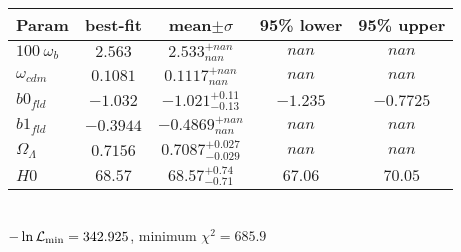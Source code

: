 \begin{tabular}{|l|c|c|c|c|} 
 \hline 
Param & best-fit & mean$\pm\sigma$ & 95\% lower & 95\% upper \\ \hline 
$100~\omega_{b }$ &$2.563$ & $2.533_{nan}^{+nan}$ & $nan$ & $nan$ \\ 
$\omega_{cdm }$ &$0.1081$ & $0.1117_{nan}^{+nan}$ & $nan$ & $nan$ \\ 
$b0_{fld }$ &$-1.032$ & $-1.021_{-0.13}^{+0.11}$ & $-1.235$ & $-0.7725$ \\ 
$b1_{fld }$ &$-0.3944$ & $-0.4869_{nan}^{+nan}$ & $nan$ & $nan$ \\ 
$\Omega_{\Lambda }$ &$0.7156$ & $0.7087_{-0.029}^{+0.027}$ & $nan$ & $nan$ \\ 
$H0$ &$68.57$ & $68.57_{-0.71}^{+0.74}$ & $67.06$ & $70.05$ \\ 
\hline 
 \end{tabular} \\ 
$-\ln{\cal L}_\mathrm{min} =342.925$, minimum $\chi^2=685.9$ \\ 
